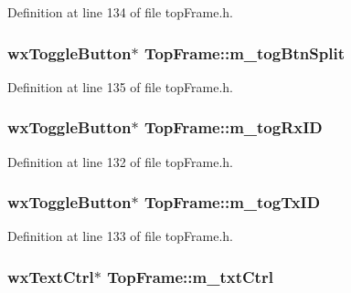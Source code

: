 Definition at line 134 of file top\-Frame.\-h.

\hypertarget{class_top_frame_a787ed365379f1fc2a2b51bbde67ad575}{
\subsubsection[{m\-\_\-tog\-Btn\-Split}]{\setlength{\rightskip}{0pt plus 5cm}wx\-Toggle\-Button$\ast$ Top\-Frame\-::m\-\_\-tog\-Btn\-Split}}\label{class_top_frame_a787ed365379f1fc2a2b51bbde67ad575}


Definition at line 135 of file top\-Frame.\-h.

\hypertarget{class_top_frame_ab66518823dd4d7b1f2802676ac651cdc}{
\subsubsection[{m\-\_\-tog\-Rx\-I\-D}]{\setlength{\rightskip}{0pt plus 5cm}wx\-Toggle\-Button$\ast$ Top\-Frame\-::m\-\_\-tog\-Rx\-I\-D}}\label{class_top_frame_ab66518823dd4d7b1f2802676ac651cdc}


Definition at line 132 of file top\-Frame.\-h.

\hypertarget{class_top_frame_af862a4419c535f7ffef6f23b9f2e2a7d}{
\subsubsection[{m\-\_\-tog\-Tx\-I\-D}]{\setlength{\rightskip}{0pt plus 5cm}wx\-Toggle\-Button$\ast$ Top\-Frame\-::m\-\_\-tog\-Tx\-I\-D}}\label{class_top_frame_af862a4419c535f7ffef6f23b9f2e2a7d}


Definition at line 133 of file top\-Frame.\-h.

\hypertarget{class_top_frame_a7611a87ad6897f435cae4f9f972195b1}{
\subsubsection[{m\-\_\-txt\-Ctrl}]{\setlength{\rightskip}{0pt plus 5cm}wx\-Text\-Ctrl$\ast$ Top\-Frame\-::m\-\_\-txt\-Ctrl\hspace{0.3cm}{\ttfamily [protected]}}}\label{class_top_frame_a7611a87ad6897f435cae4f9f972195b1}


